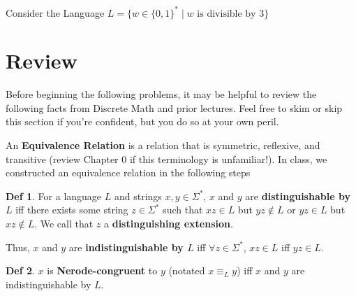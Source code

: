 \documentclass{exam}
\theoremstyle{definition}
\newtheorem*{definition}{Def}
\begin{document}
\begin{questions}
    \question Consider the Language $L = \{w \in \{0,1\}^* \mid \text{$w$ is divisible by 3}\}$

\end{questions}
\newpage
\section*{Review}
Before beginning the following problems, it may be helpful to review the following facts from Discrete Math and prior lectures. Feel free to skim or skip this section if you're confident, but you do so at your own peril.

An \textbf{Equivalence Relation} is a relation that is symmetric, reflexive, and transitive (review Chapter 0 if this terminology is unfamiliar!). In class, we constructed an equivalence relation in the following steps

\begin{definition}
    For a language $L$ and strings $x,y \in \Sigma^*$, $x$ and $y$ are \textbf{distinguishable by $L$} iff there exists some string $z \in \Sigma^*$ such that $xz \in L$ but $yz \notin L$ or $yz \in L$ but $xz \notin L$. We call that $z$ a \textbf{distinguishing extension}.

    Thus, $x$ and $y$ are \textbf{indistinguishable by $L$} iff $\forall z \in \Sigma^*$, $xz \in L$ iff $yz \in L$.
\end{definition}

\begin{definition}
    $x$ is \textbf{Nerode-congruent} to $y$ (notated $x \equiv_L y$) iff $x$ and $y$ are indistinguishable by $L$.
\end{definition}
\end{document}

